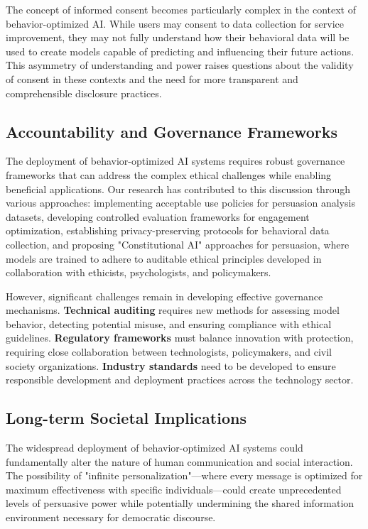 The concept of informed consent becomes particularly complex in the context of behavior-optimized AI. While users may consent to data collection for service improvement, they may not fully understand how their behavioral data will be used to create models capable of predicting and influencing their future actions. This asymmetry of understanding and power raises questions about the validity of consent in these contexts and the need for more transparent and comprehensible disclosure practices.

\subsection{Accountability and Governance Frameworks}

The deployment of behavior-optimized AI systems requires robust governance frameworks that can address the complex ethical challenges while enabling beneficial applications. Our research has contributed to this discussion through various approaches: implementing acceptable use policies for persuasion analysis datasets, developing controlled evaluation frameworks for engagement optimization, establishing privacy-preserving protocols for behavioral data collection, and proposing "Constitutional AI" approaches for persuasion, where models are trained to adhere to auditable ethical principles developed in collaboration with ethicists, psychologists, and policymakers.

However, significant challenges remain in developing effective governance mechanisms. \textbf{Technical auditing} requires new methods for assessing model behavior, detecting potential misuse, and ensuring compliance with ethical guidelines. \textbf{Regulatory frameworks} must balance innovation with protection, requiring close collaboration between technologists, policymakers, and civil society organizations. \textbf{Industry standards} need to be developed to ensure responsible development and deployment practices across the technology sector.

\subsection{Long-term Societal Implications}

The widespread deployment of behavior-optimized AI systems could fundamentally alter the nature of human communication and social interaction. The possibility of "infinite personalization"—where every message is optimized for maximum effectiveness with specific individuals—could create unprecedented levels of persuasive power while potentially undermining the shared information environment necessary for democratic discourse.

